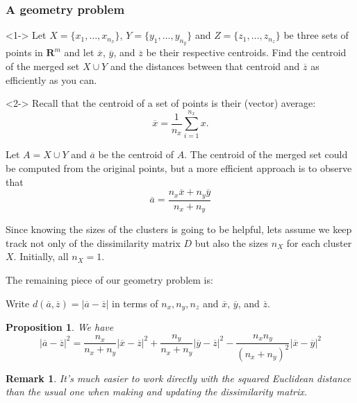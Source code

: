 \documentclass[colorlinks=true,linkcolor=blue]{beamer}
\newtheorem{remark}{Remark}
\newtheorem{proposition}{Proposition}
\begin{document}
\begin{frame}
  \frametitle{A geometry problem}
  \begin{problem}<1->
   Let $X=\{x_1,\ldots, x_{n_x}\}$, $Y=\{y_1,\ldots,y_{n_y}\}$ and $Z=\{z_1, \ldots, z_{n_z}\}$ be three sets
    of points in
    $\mathbf{R}^{m}$ and let $\overline{x}$, $\overline{y}$, and $\overline{z}$ be their respective centroids.
    Find the centroid of the merged set $X\cup Y$
    and the distances between that centroid and $\overline{z}$ as efficiently as you can.
  \end{problem}
\begin{block}{}<2->
  Recall that the centroid of a set of points is their (vector) average:
  $$
  \overline{x}=\frac{1}{n_x}\sum_{i=1}^{n_x} x.
  $$

  Let $A=X\cup Y$ and $\overline{a}$ be the centroid of $A$.
  The centroid of the merged set could be computed from the original points, but a more efficient approach
  is to observe that
  $$
  \overline{a}=\frac{n_x\overline{x}+n_y\overline{y}}{n_x+n_y}
  $$
\end{block}
\end{frame}
\begin{frame}
 Since knowing the sizes of the clusters is going to be helpful, lets assume we keep track not only of the dissimilarity matrix $D$ but also the sizes $n_X$ for each cluster $X$.  Initially, all $n_X=1$.

The remaining piece of our geometry problem is:
\begin{problem} Write $d(\overline{a},\overline{z})=|\overline{a}-\overline{z}|$ in terms of $n_x, n_y, n_z$ and $\overline{x}$, $\overline{y}$, and $\overline{z}$.
\end{problem}

\begin{proposition} We have
  $$
  |\overline{a}-\overline{z}|^2 =\frac{n_x}{n_x+n_y}|\overline{x}-\overline{z}|^2+\frac{n_y}{n_x+n_y}|\overline{y}-\overline{z}|^2-\frac{n_x n_y}{(n_x+n_y)^2}|\overline{x}-\overline{y}|^2
  $$
  \end{proposition}

  \begin{remark} It's much easier to work directly with the squared Euclidean distance than the usual one when making and updating the dissimilarity matrix.
    \end{remark}
  
\end{frame}
\end{document}
